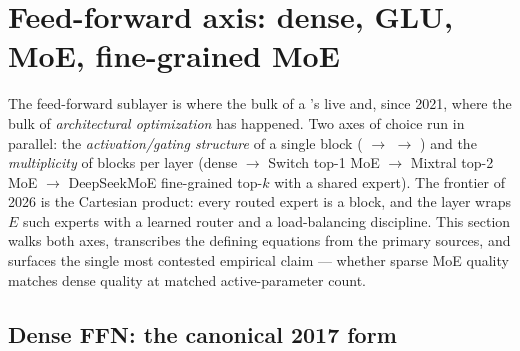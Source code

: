 
\section{Feed-forward axis: dense, GLU, MoE, fine-grained MoE}
\label{sec:ffn}
\label{sec:feedforward-axis}
\label{sec:ffn-axis}

The feed-forward sublayer is where the bulk of a 's
 live and, since 2021, where the bulk of \emph{architectural
optimization} has happened. Two axes of choice run in parallel: the
\emph{activation/gating structure} of a single  block ( $\to$
 $\to$ ) and the \emph{multiplicity} of  blocks per layer
(dense $\to$ Switch top-1 MoE $\to$ Mixtral top-2 MoE $\to$
DeepSeekMoE fine-grained top-$k$ with a shared expert). The frontier
of 2026 is the Cartesian product: every routed expert is a 
block, and the layer wraps $E$ such experts with a learned router and
a load-balancing discipline. This section walks both axes, transcribes
the defining equations from the primary sources, and surfaces the
single most contested empirical claim --- whether sparse MoE quality
matches dense quality at matched active-parameter count.

\subsection{Dense FFN: the canonical 2017 form}
\label{sec:ffn-vaswani}

